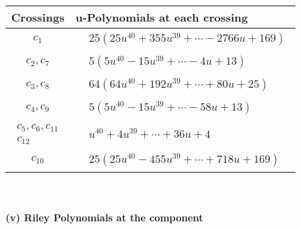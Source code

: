 \documentclass[1p]{elsarticle_modified}
\theoremstyle{definition}
\begin{document}
\begin{tabular}{m{50pt}|m{274pt}}
Crossings & \hspace{64pt}u-Polynomials at each crossing \\
\hline $$\begin{aligned}c_{1}\end{aligned}$$&$\begin{aligned}
&25(25 u^{40}+355 u^{39}+\cdots-2766 u+169)
\end{aligned}$\\
\hline $$\begin{aligned}c_{2},c_{7}\end{aligned}$$&$\begin{aligned}
&5(5 u^{40}-15 u^{39}+\cdots-4 u+13)
\end{aligned}$\\
\hline $$\begin{aligned}c_{3},c_{8}\end{aligned}$$&$\begin{aligned}
&64(64 u^{40}+192 u^{39}+\cdots+80 u+25)
\end{aligned}$\\
\hline $$\begin{aligned}c_{4},c_{9}\end{aligned}$$&$\begin{aligned}
&5(5 u^{40}-15 u^{39}+\cdots-58 u+13)
\end{aligned}$\\
\hline $$\begin{aligned}c_{5},c_{6},c_{11}\\c_{12}\end{aligned}$$&$\begin{aligned}
&u^{40}+4 u^{39}+\cdots+36 u+4
\end{aligned}$\\
\hline $$\begin{aligned}c_{10}\end{aligned}$$&$\begin{aligned}
&25(25 u^{40}-455 u^{39}+\cdots+718 u+169)
\end{aligned}$\\
\hline
\end{tabular}\\~\\
\newpage\renewcommand{\arraystretch}{1}
\flushleft \textbf{(v) Riley Polynomials at the component}\newline \\
\end{document}
